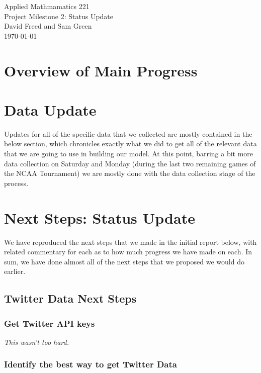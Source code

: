 \documentclass[12pt]{article}
\begin{document}
\begin{center}
{\Large Applied Mathmamatics 221}\\
Project Milestone 2: Status Update\\
David Freed and Sam Green\\
\today
\end{center}

\section*{Overview of Main Progress}



\section*{Data Update}

Updates for all of the specific data that we collected are mostly contained in the below section, which chronicles exactly what we did to get all of the relevant data that we are going to use in building our model. At this point, barring a bit more data collection on Saturday and Monday (during the last two remaining games of the NCAA Tournament) we are mostly done with the data collection stage of the process. 

\section*{Next Steps: Status Update}

We have reproduced the next steps that we made in the initial report below, with related commentary for each as to how much progress we have made on each. In sum, we have done almost all of the next steps that we proposed we would do earlier. 

\subsection*{Twitter Data Next Steps}
\subsubsection*{Get Twitter API keys}

\textit{This wasn't too hard.}

\subsubsection*{Identify the best way to get Twitter Data}
\end{document}
